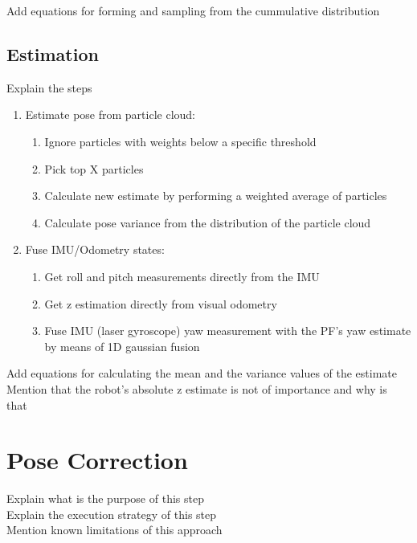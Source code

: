 \noindent
Add equations for forming and sampling from the cummulative distribution

\subsection{Estimation}

Explain the steps

\begin{enumerate}
    \item Estimate pose from particle cloud:
        \begin{enumerate}
            \item Ignore particles with weights below a specific threshold
            \item Pick top X particles
            \item Calculate new estimate by performing a weighted average of particles
            \item Calculate pose variance from the distribution of the particle cloud
        \end{enumerate}
    \item Fuse IMU/Odometry states:
        \begin{enumerate}
            \item Get roll and pitch measurements directly from the IMU
            \item Get z estimation directly from visual odometry
            \item Fuse IMU (laser gyroscope) yaw measurement with the PF's yaw estimate by means of 1D gaussian fusion
        \end{enumerate}
\end{enumerate}

\noindent
Add equations for calculating the mean and the variance values of the estimate\\
Mention that the robot's absolute z estimate is not of importance and why is that

\section{Pose Correction}

Explain what is the purpose of this step\\
Explain the execution strategy of this step\\
Mention known limitations of this approach

